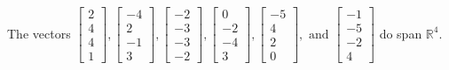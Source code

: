 \begin{exercise}
\begin{exerciseStatement}
  \end{exerciseStatement}
  \begin{exerciseAnswer}
   The vectors \(\left[\begin{array}{r}
2 \\
4 \\
4 \\
1
\end{array}\right] , \left[\begin{array}{r}
-4 \\
2 \\
-1 \\
3
\end{array}\right] , \left[\begin{array}{r}
-2 \\
-3 \\
-3 \\
-2
\end{array}\right] , \left[\begin{array}{r}
0 \\
-2 \\
-4 \\
3
\end{array}\right] , \left[\begin{array}{r}
-5 \\
4 \\
2 \\
0
\end{array}\right] , \text{ and } \left[\begin{array}{r}
-1 \\
-5 \\
-2 \\
4
\end{array}\right]\) 
  	 do  
	span \(\mathbb{R}^4\).
  


  \end{exerciseAnswer}
\end{exercise}